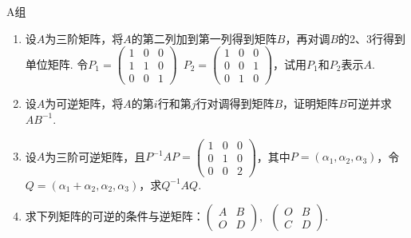 \centerline{\heiti A组}
\begin{enumerate}
    \item 设$A$为三阶矩阵，将$A$的第二列加到第一列得到矩阵$B$，再对调$B$的2、3行得到单位矩阵. 令$P_1=\begin{pmatrix}1 & 0 & 0 \\ 1 & 1 & 0 \\ 0 & 0 & 1\end{pmatrix}\enspace
              P_2=\begin{pmatrix}1 & 0 & 0 \\ 0 & 0 & 1 \\ 0 & 1 & 0\end{pmatrix}$，试用$P_1$和$P_2$表示$A$.

    \item 设$A$为可逆矩阵，将$A$的第$i$行和第$j$行对调得到矩阵$B$，证明矩阵$B$可逆并求$AB^{-1}$.

    \item 设$A$为三阶可逆矩阵，且$P^{-1}AP=\begin{pmatrix}1 & 0 & 0 \\ 0 & 1 & 0 \\ 0 & 0 & 2\end{pmatrix}$，其中$P=(\alpha_1,\alpha_2,\alpha_3)$，令$Q=(\alpha_1+\alpha_2,\alpha_2,\alpha_3)$，求$Q^{-1}AQ$.

    \item 求下列矩阵的可逆的条件与逆矩阵：$\begin{pmatrix}
                  A & B \\ O & D
              \end{pmatrix},\enspace \begin{pmatrix}
                  O & B \\ C & D
              \end{pmatrix}$.
\end{enumerate}

